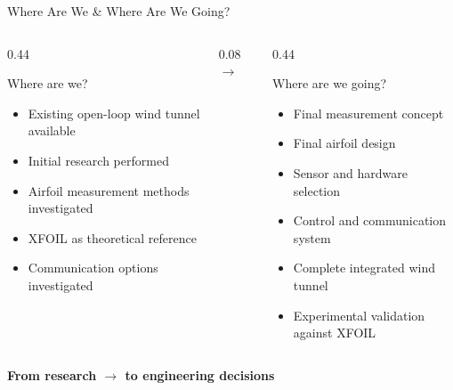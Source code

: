 \documentclass[aspectratio=169,10pt]{beamer}
\newenvironment{points}{\begin{itemize}\setlength{\itemsep}{0.45em}}{\end{itemize}}
\begin{document}
\begin{frame}{Where Are We \& Where Are We Going?}
  \begin{columns}[c,onlytextwidth]
    \begin{column}{0.44\textwidth}
      \begin{block}{Where are we?}
        \begin{points}
          \item Existing open-loop wind tunnel available
          \item Initial research performed
          \item Airfoil measurement methods investigated
          \item XFOIL as theoretical reference
          \item Communication options investigated
        \end{points}
      \end{block}
    \end{column}
    \begin{column}{0.08\textwidth}
      \centering\color{structure.fg}\Huge$\longrightarrow$
    \end{column}
    \begin{column}{0.44\textwidth}
      \begin{block}{Where are we going?}
        \begin{points}
          \item Final measurement concept
          \item Final airfoil design
          \item Sensor and hardware selection
          \item Control and communication system
          \item Complete integrated wind tunnel
          \item Experimental validation against XFOIL
        \end{points}
      \end{block}
    \end{column}
  \end{columns}
  \vspace{0.5em}
  \begin{center}\color{structure.fg}\large\bfseries
    From research $\longrightarrow$ to engineering decisions
  \end{center}
\end{frame}
\end{document}
